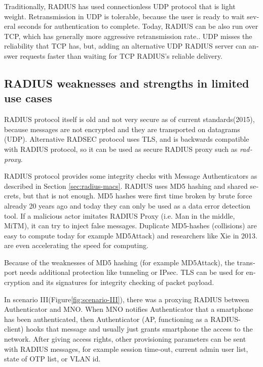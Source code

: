 \documentclass[12pt,a4paper,english]{tutthesis}
\begin{document}
\begin{otherlanguage}{english}
Traditionally, RADIUS has used connection\-less UDP protocol that is
light weight. Retransmission in UDP is tolerable, because the user is
ready to wait several seconds for authentication to complete.  
Today, RADIUS can be also run over TCP, which has generally more
aggressive retransmission rate.\cite[Section 2.2.1]{rfc5080}.
UDP misses the reliability that TCP has, but, adding an alternative UDP RADIUS
server can answer requests faster than waiting for TCP RADIUS's reliable delivery.


\subsection{RADIUS weaknesses and strengths in limited use cases}
\label{sec-6-1-4}


RADIUS protocol itself is old and not very secure as of current
standards(2015), because messages are not encrypted and they are
transported on datagrams (UDP). Alternative RADSEC protocol uses TLS, and 
is backwards compatible with RADIUS protocol, so it can be used
as secure RADIUS proxy such as \emph{radproxy}\cite{uninett-radproxy}.

RADIUS protocol provides some integrity checks with Message
Authenticators as described in Section \ref{sec:radius-macs}.  RADIUS uses
MD5 hashing and shared secrets, but that is not enough.  MD5 hashes
were first time broken by brute force already 20 years ago and today
they can only be used as a data error detection
tool\cite[p.2]{rfc6151}.  If a malicious actor imitates RADIUS Proxy
(i.e. Man in the middle, MiTM), it can try to inject false messages.
Duplicate MD5-hashes (collisions) are easy to compute today for
example MD5Attack\cite{rfc5176}) and researchers like Xie in
2013\cite{xie2013fast}.  are even accelerating the speed for
computing.

 Because of the weaknesses of MD5 hashing (for example
MD5Attack\cite{rfc5176}), the transport needs additional protection
like tunneling or IPsec. TLS can be used for encryption and its
signatures for integrity checking of packet payload.





In scenario III(Figure\ref{fig:scenario-III}),  there was a proxying RADIUS between Authenticator
and MNO.  When MNO notifies Authenticator
that a smartphone has been authenticated, then Authenticator (AP, functioning
as a RADIUS-client) hooks that message and usually just grants
smartphone the access to the network. After giving access rights, other
provisioning parameters can be sent with RADIUS messages, for example
session time-out,
current admin user list, state of OTP list, or VLAN id.



\end{otherlanguage}
\end{document}
